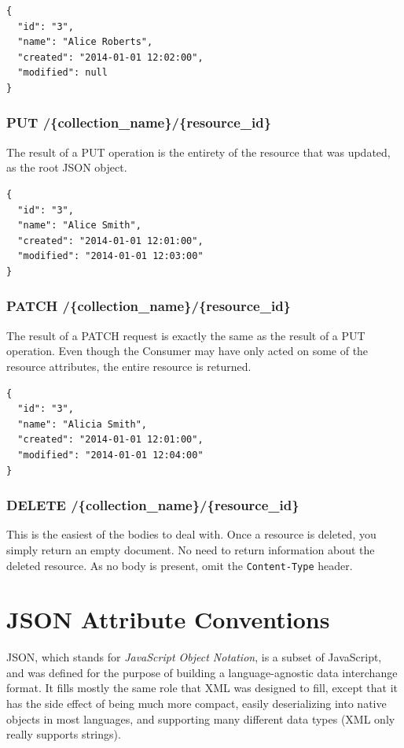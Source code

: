 \documentclass{book}
\begin{document}
\begin{verbatim}
{
  "id": "3",
  "name": "Alice Roberts",
  "created": "2014-01-01 12:02:00",
  "modified": null
}
\end{verbatim}

\subsubsection{PUT /\{collection\_name\}/\{resource\_id\}}

The result of a PUT operation is the entirety of the resource that was updated, as the root JSON object.

\begin{verbatim}
{
  "id": "3",
  "name": "Alice Smith",
  "created": "2014-01-01 12:01:00",
  "modified": "2014-01-01 12:03:00"
}
\end{verbatim}

\subsubsection{PATCH /\{collection\_name\}/\{resource\_id\}}

The result of a PATCH request is exactly the same as the result of a PUT operation. Even though the Consumer may have only acted on some of the resource attributes, the entire resource is returned.

\begin{verbatim}
{
  "id": "3",
  "name": "Alicia Smith",
  "created": "2014-01-01 12:01:00",
  "modified": "2014-01-01 12:04:00"
}
\end{verbatim}

\subsubsection{DELETE /\{collection\_name\}/\{resource\_id\}}

This is the easiest of the bodies to deal with. Once a resource is deleted, you simply return an empty document. No need to return information about the deleted resource. As no body is present, omit the \texttt{Content-Type} header.


\section{JSON Attribute Conventions}

JSON, which stands for \emph{JavaScript Object Notation}, is a subset of JavaScript, and was defined for the purpose of building a language-agnostic data interchange format. It fills mostly the same role that XML was designed to fill, except that it has the side effect of being much more compact, easily deserializing into native objects in most languages, and supporting many different data types (XML only really supports strings).
\end{document}
